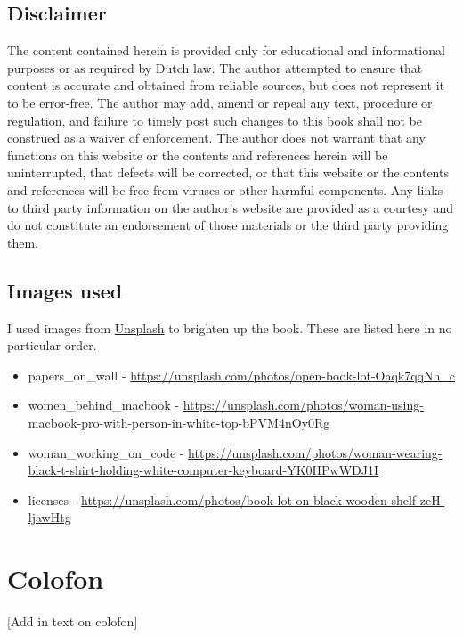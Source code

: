 \documentclass[
]{book}
\providecommand{\tightlist}{%
  \setlength{\itemsep}{0pt}\setlength{\parskip}{0pt}}
\begin{document}
\hypertarget{disclaimer}{%
\section{Disclaimer}\label{disclaimer}}

The content contained herein is provided only for educational and informational purposes or as required by Dutch law. The author attempted to ensure that content is accurate and obtained from reliable sources, but does not represent it to be error-free. The author may add, amend or repeal any text, procedure or regulation, and failure to timely post such changes to this book shall not be construed as a waiver of enforcement. The author does not warrant that any functions on this website or the contents and references herein will be uninterrupted, that defects will be corrected, or that this website or the contents and references will be free from viruses or other harmful components. Any links to third party information on the author's website are provided as a courtesy and do not constitute an endorsement of those materials or the third party providing them.

\hypertarget{images-used}{%
\section{Images used}\label{images-used}}

I used images from \href{https://unsplash.com/s/photos/legal}{Unsplash} to brighten up the book. These are listed here in no particular order.

\begin{itemize}
\tightlist
\item
  papers\_on\_wall - \url{https://unsplash.com/photos/open-book-lot-Oaqk7qqNh_c}
\item
  women\_behind\_macbook - \url{https://unsplash.com/photos/woman-using-macbook-pro-with-person-in-white-top-bPVM4nOy0Rg}
\item
  woman\_working\_on\_code - \url{https://unsplash.com/photos/woman-wearing-black-t-shirt-holding-white-computer-keyboard-YK0HPwWDJ1I}
\item
  licenses - \url{https://unsplash.com/photos/book-lot-on-black-wooden-shelf-zeH-ljawHtg}
\end{itemize}

\hypertarget{colofon}{%
\chapter{Colofon}\label{colofon}}

{[}Add in text on colofon{]}

  
\end{document}
